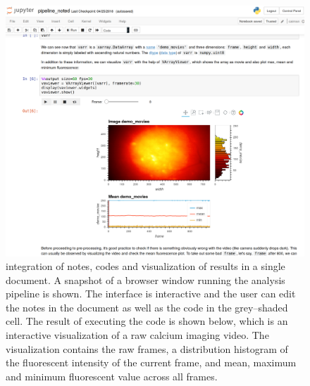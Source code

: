 \documentclass[master.tex]{subfiles}
\begin{document}
\begin{figure}
  \centering \includegraphics[scale = .13]{Figures/prelim_minian.png}
  \caption{\footnotesize integration of notes, codes and visualization of
    results in a single document. A snapshot of a browser window running the
    analysis pipeline is shown. The interface is interactive and the user can
    edit the notes in the document as well as the code in the grey--shaded cell.
    The result of executing the code is shown below, which is an interactive
    visualization of a raw calcium imaging video. The visualization contains the
    raw frames, a distribution histogram of the fluorescent intensity of the
    current frame, and mean, maximum and minimum fluorescent value across all
    frames.}
  \label{fig:prelim_minian}
\end{figure}

\end{document}
